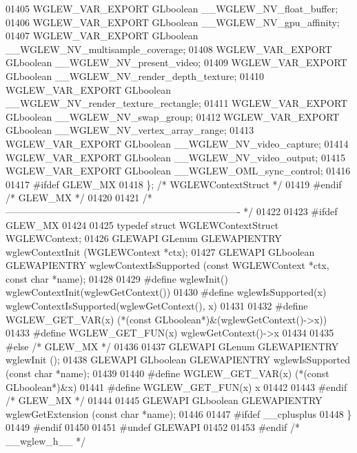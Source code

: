 \begin{DoxyCode}
01405 WGLEW_VAR_EXPORT GLboolean __WGLEW_NV_float_buffer;
01406 WGLEW_VAR_EXPORT GLboolean __WGLEW_NV_gpu_affinity;
01407 WGLEW_VAR_EXPORT GLboolean __WGLEW_NV_multisample_coverage;
01408 WGLEW_VAR_EXPORT GLboolean __WGLEW_NV_present_video;
01409 WGLEW_VAR_EXPORT GLboolean __WGLEW_NV_render_depth_texture;
01410 WGLEW_VAR_EXPORT GLboolean __WGLEW_NV_render_texture_rectangle;
01411 WGLEW_VAR_EXPORT GLboolean __WGLEW_NV_swap_group;
01412 WGLEW_VAR_EXPORT GLboolean __WGLEW_NV_vertex_array_range;
01413 WGLEW_VAR_EXPORT GLboolean __WGLEW_NV_video_capture;
01414 WGLEW_VAR_EXPORT GLboolean __WGLEW_NV_video_output;
01415 WGLEW_VAR_EXPORT GLboolean __WGLEW_OML_sync_control;
01416 
01417 \textcolor{preprocessor}{#ifdef GLEW\_MX}
01418 \}; \textcolor{comment}{/* WGLEWContextStruct */}
01419 \textcolor{preprocessor}{#endif }\textcolor{comment}{/* GLEW\_MX */}\textcolor{preprocessor}{}
01420 
01421 \textcolor{comment}{/* ------------------------------------------------------------------------- */}
01422 
01423 \textcolor{preprocessor}{#ifdef GLEW\_MX}
01424 
01425 \textcolor{keyword}{typedef} \textcolor{keyword}{struct }WGLEWContextStruct WGLEWContext;
01426 GLEWAPI GLenum GLEWAPIENTRY wglewContextInit (WGLEWContext *ctx);
01427 GLEWAPI GLboolean GLEWAPIENTRY wglewContextIsSupported (\textcolor{keyword}{const} WGLEWContext *ctx, \textcolor{keyword}{const} \textcolor{keywordtype}{char} *name);
01428 
01429 \textcolor{preprocessor}{#define wglewInit() wglewContextInit(wglewGetContext())}
01430 \textcolor{preprocessor}{#define wglewIsSupported(x) wglewContextIsSupported(wglewGetContext(), x)}
01431 
01432 \textcolor{preprocessor}{#define WGLEW\_GET\_VAR(x) (*(const GLboolean*)&(wglewGetContext()->x))}
01433 \textcolor{preprocessor}{#define WGLEW\_GET\_FUN(x) wglewGetContext()->x}
01434 
01435 \textcolor{preprocessor}{#else }\textcolor{comment}{/* GLEW\_MX */}\textcolor{preprocessor}{}
01436 
01437 GLEWAPI GLenum GLEWAPIENTRY wglewInit ();
01438 GLEWAPI GLboolean GLEWAPIENTRY wglewIsSupported (\textcolor{keyword}{const} \textcolor{keywordtype}{char} *name);
01439 
01440 \textcolor{preprocessor}{#define WGLEW\_GET\_VAR(x) (*(const GLboolean*)&x)}
01441 \textcolor{preprocessor}{#define WGLEW\_GET\_FUN(x) x}
01442 
01443 \textcolor{preprocessor}{#endif }\textcolor{comment}{/* GLEW\_MX */}\textcolor{preprocessor}{}
01444 
01445 GLEWAPI GLboolean GLEWAPIENTRY wglewGetExtension (\textcolor{keyword}{const} \textcolor{keywordtype}{char} *name);
01446 
01447 \textcolor{preprocessor}{#ifdef \_\_cplusplus}
01448 \}
01449 \textcolor{preprocessor}{#endif}
01450 
01451 \textcolor{preprocessor}{#undef GLEWAPI}
01452 
01453 \textcolor{preprocessor}{#endif }\textcolor{comment}{/* \_\_wglew\_h\_\_ */}\textcolor{preprocessor}{}
\end{DoxyCode}
